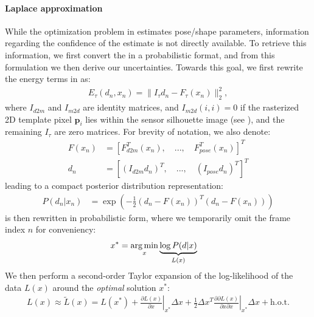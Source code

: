 \paragraph{Laplace approximation}
\label{sec:posterior}
While the optimization problem in  estimates pose/shape parameters, information regarding the confidence of the estimate is not directly available. To retrieve this information, we first convert the  in a probabilistic format, and from this formulation we then derive our uncertainties. Towards this goal, we first rewrite the energy terms in  as:
% 
\begin{align}
E_{\tau}(d_n, x_n) = \|I_{\tau} d_n - F_{\tau} (x_n)\|_2^2,
\end{align} 
where $I_{d2m}$ and $I_{m2d}$ are identity matrices, and $I_{m2d}(i,i)=0$ if the rasterized 2D template pixel $\mathbf{p}_i$ lies within the sensor silhouette image  (see \cite{htrack}), and the remaining $I_{\tau}$ are zero matrices.
For brevity of notation, we also denote:
% 
\begin{align*}
F(x_n) &= \left[F_{d2m}^T(x_n), \quad ..., \quad F_{pose}^T(x_n)\right]^T \\
d_n &= \left[(I_{d2m} d_n)^T, \quad ..., \quad (I_{pose} d_n)^T\right]^T
\end{align*}
% 
leading to a compact posterior distribution representation:
% 
\begin{align}
P(d_n|x_n) &= \exp \left( - \tfrac{1}{2}(d_n - F(x_n))^T (d_n - F(x_n)) \right)
\label{eq:posterior}
\end{align}
% 
 is then rewritten in probabilistic form, where we temporarily omit the frame index $n$ for conveniency:
%
\begin{align}
x^* &= \operatorname*{arg\,min}_{x} \underbrace{\log  P(d|x)}_{L(x)}
\label{eq:independent}
\end{align}
%
We then perform a second-order Taylor expansion of the log-likelihood of the data $L(x)$ around the \emph{optimal} solution $x^*$:
%
\begin{align*}
L(x) \approx \tilde{L}(x) = L(x^*)   
+ \left. \tfrac{\partial L(x) }{\partial x}\right|_{x^*}  \Delta x 
+ \left. \tfrac{1}{2} \Delta x^T\tfrac{\partial \partial L(x)}{\partial x \partial x} \right|_{x^*} \Delta x + \text{h.o.t.}
\end{align*}
